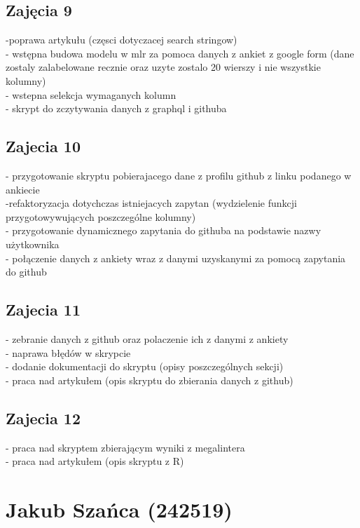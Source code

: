 \documentclass[graybox]{svmult}
\begin{document}
\subsection{Zajęcia 9}
-poprawa artykułu (częsci dotyczacej search stringow)
\\- wstępna budowa modelu w mlr za pomoca danych z ankiet z google form (dane zostaly zalabelowane recznie oraz uzyte zostalo 20 wierszy i nie wszystkie kolumny)
\\- wstepna selekcja wymaganych kolumn
\\- skrypt do zczytywania danych z graphql i githuba

\subsection{Zajecia 10}
- przygotowanie skryptu pobierajacego dane z profilu github z linku podanego w ankiecie
\\ -refaktoryzacja dotychczas istniejacych zapytan (wydzielenie funkcji przygotowywujących poszczególne kolumny)
\\ - przygotowanie dynamicznego zapytania do githuba na podstawie nazwy użytkownika
\\ - połączenie danych z ankiety wraz z danymi uzyskanymi za pomocą zapytania do github

\subsection{Zajecia 11}
- zebranie danych z github oraz polaczenie ich z danymi z ankiety
\\- naprawa błędów w skrypcie
\\- dodanie dokumentacji do skryptu (opisy poszczególnych sekcji)
\\- praca nad artykułem (opis skryptu do zbierania danych z github)

\subsection{Zajecia 12}
- praca nad skryptem zbierającym wyniki z megalintera
\\- praca nad artykułem (opis skryptu z R)


\newpage

\section{Jakub Szańca (242519)}
\end{document}
